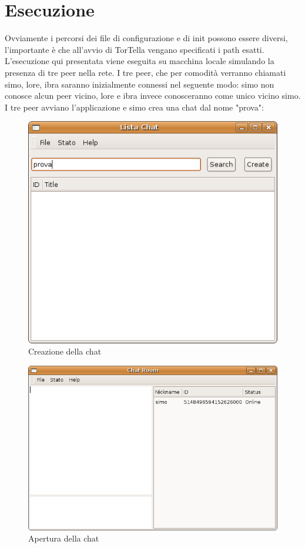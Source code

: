 \section{Esecuzione}
Ovviamente i percorsi dei file di configurazione e di init possono essere diversi, l'importante è che all'avvio di TorTella vengano specificati i path esatti.
L'esecuzione qui presentata viene eseguita su macchina locale simulando la presenza di tre peer nella rete. I tre peer, che per comodità verranno chiamati simo, lore, ibra saranno inizialmente connessi nel seguente modo: simo non conosce alcun peer vicino, lore e ibra invece conosceranno come unico vicino simo. I tre peer avviano l'applicazione e simo crea una chat dal nome "prova":
\begin{figure}[H]
\begin{center}
\includegraphics[scale=0.5]{etc/crea_chat.png}
\caption{Creazione della chat}
\label{creachat}
\end{center}
\end{figure}
\begin{figure}[H]
\begin{center}
\includegraphics[scale=0.5]{etc/apertura_chat.png}
\caption{Apertura della chat}
\label{aperturachat}
\end{center}
\end{figure}
